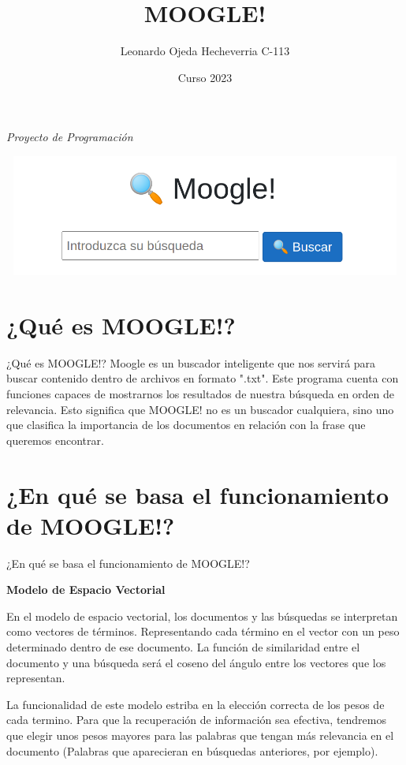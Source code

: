 \documentclass[aspectratio = 169]{beamer}
\title{\Huge MOOGLE!}
\author{Leonardo Ojeda Hecheverria C-113}
\institute{Universidad de La Habana\\Facultad de Matemática y Computación}
\date{Curso 2023}
\begin{document}
\maketitle
\begin{center}
\vfill
\vspace{2cm}
{\itshape\LARGE Proyecto de Programación \par}
\includegraphics[width=14cm, height=4cm]{moogle.png}
\end{center}

\section{¿Qué es MOOGLE!?}
\begin{frame}{¿Qué es MOOGLE!?}
\justifying
Moogle es un buscador inteligente que nos servirá para buscar contenido dentro de archivos en formato ".txt". Este programa cuenta con funciones capaces de mostrarnos los resultados de nuestra búsqueda en orden de relevancia. Esto significa que MOOGLE! no es un buscador cualquiera, sino uno que clasifica la importancia de los documentos en relación con la frase que queremos encontrar.
\end{frame}
\section{¿En qué se basa el funcionamiento de MOOGLE!?}
\begin{frame}{¿En qué se basa el funcionamiento de MOOGLE!?}
\justifying
\begin{center}\textbf{Modelo de Espacio Vectorial}\end{center}
En el modelo de espacio vectorial, los documentos y las búsquedas se interpretan como vectores de términos. Representando cada término en el vector con un peso determinado dentro de ese documento. La función de similaridad entre el documento y una búsqueda será el coseno del ángulo entre los vectores que los representan.

La funcionalidad de este modelo estriba en la elección correcta de los pesos de cada termino. Para que la recuperación de información sea efectiva, tendremos que elegir unos pesos mayores para las palabras que tengan más relevancia en el documento (Palabras que aparecieran en búsquedas anteriores, por ejemplo).
\end{frame}
\end{document}
